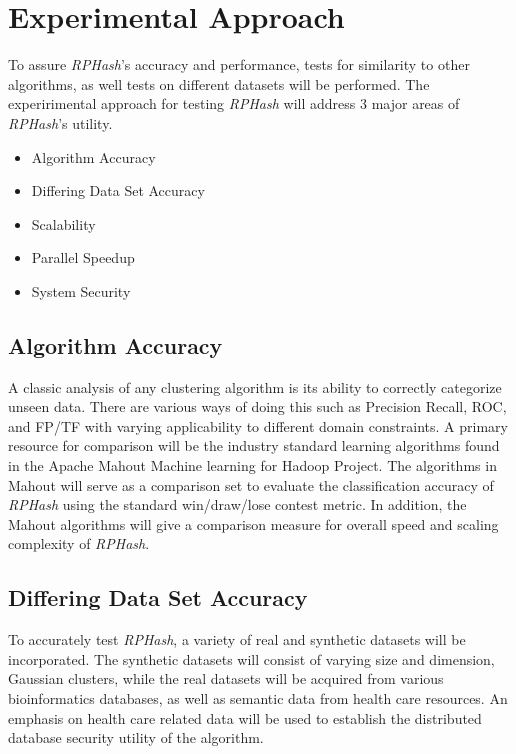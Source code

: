 \documentclass[a4paper,10pt]{article}
\begin{document}
\section{Experimental Approach}

To assure \emph{RPHash}'s accuracy and performance, tests for similarity
to other algorithms, as well tests on different datasets will be performed.
The experirimental approach for testing \emph{RPHash} will address 3 major
areas of \emph{RPHash}'s utility.  
\begin{itemize}
 \item Algorithm Accuracy 
\item Differing Data Set Accuracy 
\item Scalability
 \item Parallel Speedup 
\item System Security

\end{itemize}


\subsection{Algorithm Accuracy} A classic analysis of any clustering algorithm
is its ability to correctly categorize unseen data.  There are various ways of
doing this such as Precision Recall, ROC, and FP/TF with varying applicability
to different domain constraints.  A primary resource for comparison will
be the industry standard learning algorithms found in the Apache Mahout
Machine learning for Hadoop Project.  The algorithms in Mahout will serve
as a comparison set to evaluate the classification accuracy of \emph{RPHash}
using the standard win/draw/lose contest metric\cite{Webb2000}.  In addition,
the Mahout algorithms will give a comparison measure for overall speed and
scaling complexity of \emph{RPHash}.

\subsection{Differing Data Set Accuracy} To accurately test \emph{RPHash},
a variety of real and synthetic datasets will be incorporated.	The synthetic
datasets will consist of varying size and dimension, Gaussian clusters, while
the real datasets will be acquired from various bioinformatics databases,
as well as semantic data from health care resources.  An emphasis on health
care related data will be used to establish the distributed database security
utility of the algorithm.
\end{document}
